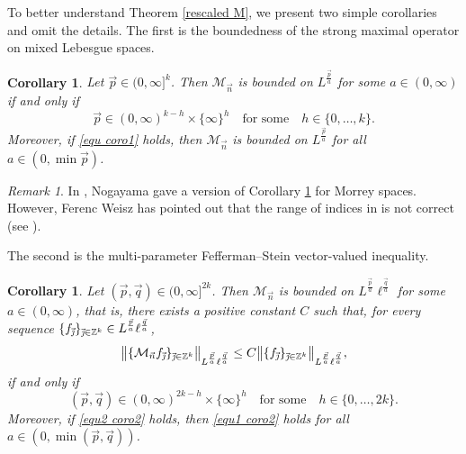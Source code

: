 \documentclass[11pt, reqno]{amsart}
\newtheorem{corollary}[theorem]{Corollary}
\theoremstyle{definition}
\theoremstyle{remark}
\newtheorem{remark}[theorem]{Remark}
\numberwithin{equation}{section}
\newcommand{\Z}{\mathbb Z}
\newcommand{\vj}{\vec{\textit{\j}}}
\newcommand{\vn}{\vec n}
\newcommand{\vp}{\vec p}
\newcommand{\vq}{\vec q}
\begin{document}
To better understand Theorem \ref{rescaled M}, we present two simple corollaries and omit the details.
The first is the boundedness of the strong maximal operator on mixed
Lebesgue spaces.

\begin{corollary} \label{coro1}
Let $\vp\in(0,\infty]^k$.
Then $\mathcal M_{\vn}$ is bounded on $L^{\frac{\vp}{a}}$
for some $a\in(0,\infty)$ if and only if
\begin{equation}\label{equ coro1}
\vp\in (0,\infty)^{k-h}\times\{\infty\}^h
\quad\text{for some}\quad  h\in\{0,\ldots,k\}.
\end{equation}
Moreover, if \eqref{equ coro1} holds, then
$\mathcal M_{\vn}$ is bounded on $L^{\frac{\vp}{a}}$
for all $a\in(0,\min \vp)$.
\end{corollary}

\begin{remark}
In \cite[Theorem 1.4]{No19}, Nogayama gave a version of Corollary \ref{coro1} for Morrey spaces.
However, Ferenc Weisz has pointed out that the range of indices in \cite[Theorem 1.4]{No19} is not correct (see \cite[Remark 3.3]{HY21}).
\end{remark}

The second is the multi-parameter Fefferman--Stein vector-valued inequality.

\begin{corollary} \label{coro2}
Let $(\vp,\vq)\in(0,\infty]^{2k}$.
Then $\mathcal M_{\vn}$ is bounded on $L^{\frac{\vp}{a}}\ell^{\frac{\vq}{a}}$
for some $a\in(0,\infty)$, that is,
there exists a positive constant $C$ such that, for every sequence $\{f_{\vj}\}_{\vj\in\Z^k}\in L^{\frac{\vp}{a}}\ell^{\frac{\vq}{a}}$,
\begin{equation}\label{equ1 coro2}
\big\| \{\mathcal M_{\vn} f_{\vj}\}_{\vj\in\Z^k} \big\|_{L^{\frac{\vp}{a}}\ell^{\frac{\vq}{a}}}
\leq C \big\| \{f_{\vj}\}_{\vj\in\Z^k} \big\|_{L^{\frac{\vp}{a}}\ell^{\frac{\vq}{a}}},
\end{equation}
if and only if
\begin{equation}\label{equ2 coro2}
(\vp,\vq)\in (0,\infty)^{2k-h}\times\{\infty\}^h
\quad\text{for some}\quad  h\in\{0,\ldots,2k\}.
\end{equation}
Moreover, if \eqref{equ2 coro2} holds, then
\eqref{equ1 coro2} holds for all $a\in(0,\min(\vp,\vq))$.
\end{corollary}
\end{document}
